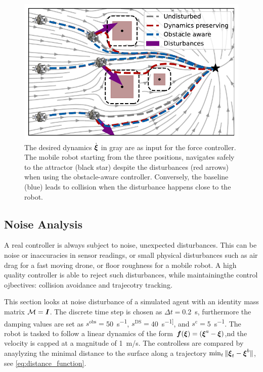 \begin{figure}
  \centering
  \centerline{\includegraphics[width=0.95\columnwidth]{figures/multi_obstacle_with_damping.pdf}}
  \caption{The desired dynamics $\dot{\boldsymbol{\xi}}$ in gray are as input for the force controller. 
  The mobile robot starting from the three positions, navigates safely to the attractor (black star) despite the disturbances (red arrows) when using the obstacle-aware controller.
  Conversely, the baseline (blue) leads to collision when the disturbance happens close to the robot.}
  \label{fig:obstacle_aware_damping_comparison}
\end{figure}

\subsection{Noise Analysis}
A real controller is always subject to noise, unexpected disturbances. This can be noise or inaccuracies in sensor readings, or small physical disturbances such as air drag for a fast moving drone, or floor roughness for a mobile robot. 
A high quality controller is able to reject such disturbances, while maintainingthe control ojbectives: collision avoidance and trajecotry tracking. 

This section looks at noise disturbance of a simulated agent with an identity mass matrix $\mathcal{M} = \boldsymbol{I}$. The discrete time step is chosen as $\Delta t = $\qty{0.2}{s}, furthermore the damping values are set as
$s^{\mathrm{obs}}=$\qty{50}{s^{-1}},
$s^{\mathrm{DS}}=$\qty{40}{s^{-1]}}, and
$s^{\mathrm{c}}=$\qty{5}{s^{-1}}.
 The robot is tasked to follow a linear dynamics of  the form $\boldsymbol{f}(\boldsymbol{\xi}) = (\boldsymbol{\xi}^a -  \boldsymbol{\xi})$,nd the velocity is capped at a magnitude of \qty{1}{m/s}. 
 The controlless are compared by anaylyzing the minimal distance to the surface along a trajectory $ \min_t \| \boldsymbol{\xi}_t - \boldsymbol{\xi}^b \| $, see \eqref{eq:distance_function}.


